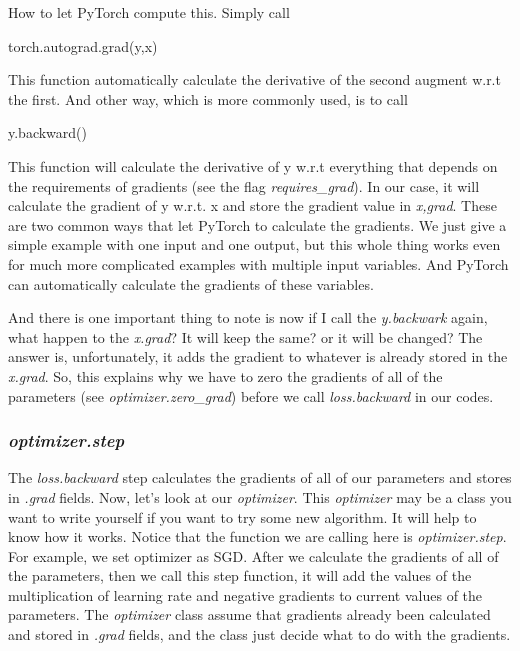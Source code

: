 How to let PyTorch compute this. Simply call 
\begin{python}
torch.autograd.grad(y,x)
\end{python}
This function automatically calculate the derivative of the second augment w.r.t the first. And other way, which is more commonly used, is to call 
\begin{python}
y.backward()
\end{python}
This function will calculate the derivative of y w.r.t everything that depends on the requirements of gradients (see the flag \emph{requires\_grad}). In our case, it will calculate the gradient of y w.r.t. x and store the gradient value in \emph{x,grad}.
These are two common ways that let PyTorch to calculate the gradients. We just give a simple example with one input and one output, but this whole thing works even for much more complicated examples with multiple input variables. And PyTorch can automatically calculate the gradients of these variables.

And there is one important thing to note is now if I call the \emph{y.backwark} again, what happen to the \emph{x.grad}? It will keep the same? or it will be changed? The answer is, unfortunately, it adds the gradient to whatever is already stored in the \emph{x.grad}. So, this explains why we have to zero the gradients of all of the parameters (see \emph{optimizer.zero\_grad}) before we call 
\emph{loss.backward} in our codes.

\subsubsection{\emph{optimizer.step}}
The \emph{loss.backward} step calculates the gradients of all of our parameters and stores in \emph{.grad} fields. Now, let's look at our \emph{optimizer}. This \emph{optimizer} may be a class you want to write yourself if you want to try some new algorithm. It will help to know how it works. 
Notice that the function we are calling here is \emph{optimizer.step}. For example, we set optimizer as SGD. After we calculate the gradients of all of the parameters, then we call this step function, it will add the values of the multiplication of learning rate and negative gradients to current values of the parameters. The \emph{optimizer} class assume that gradients already been calculated and stored in \emph{.grad} fields, and the class just decide what to do with the gradients.


